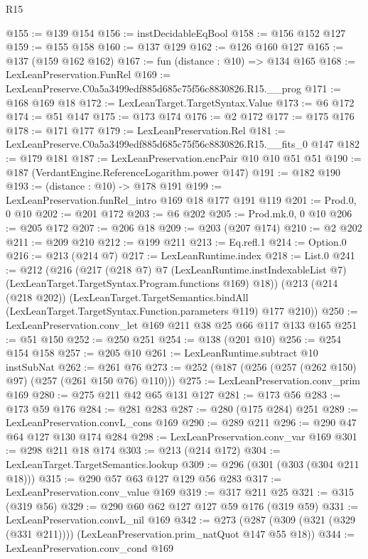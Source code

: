 \begin{lexlean}{R15}
\begin{coremodule}
@155 := @139 @154
@156 := instDecidableEqBool
@158 := @156 @152 @127
@159 := @155 @158
@160 := @137 @129
@162 := @126 @160 @127
@165 := @137 (@159 @162 @162)
@167 := fun (distance : @10) => @134 @165
@168 := LexLeanPreservation.FunRel
@169 := LexLeanPreserve.C0a5a3499edf885d685c75f56c8830826.R15.__prog
@171 := @168 @169 @18
@172 := LexLeanTarget.TargetSyntax.Value
@173 := @6 @172
@174 := @51 @147
@175 := @173 @174
@176 := @2 @172
@177 := @175 @176
@178 := @171 @177
@179 := LexLeanPreservation.Rel
@181 := LexLeanPreserve.C0a5a3499edf885d685c75f56c8830826.R15.__fits_0 @147
@182 := @179 @181
@187 := LexLeanPreservation.encPair @10 @10 @51 @51
@190 := @187 (VerdantEngine.ReferenceLogarithm.power @147)
@191 := @182 @190
@193 := (distance : @10) -> @178 @191
@199 := LexLeanPreservation.funRel_intro @169 @18 @177 @191 @119
@201 := Prod.{0, 0} @10
@202 := @201 @172
@203 := @6 @202
@205 := Prod.mk.{0, 0} @10
@206 := @205 @172
@207 := @206 @18
@209 := @203 (@207 @174)
@210 := @2 @202
@211 := @209 @210
@212 := @199 @211
@213 := Eq.refl.{1}
@214 := Option.{0}
@216 := @213 (@214 @7)
@217 := LexLeanRuntime.index
@218 := List.{0}
@241 := @212
    (@216
      (@217
        (@218 @7)
        @7
        (LexLeanRuntime.instIndexableList @7)
        (LexLeanTarget.TargetSyntax.Program.functions @169)
        @18))
    (@213
      (@214 (@218 @202))
      (LexLeanTarget.TargetSemantics.bindAll
        (LexLeanTarget.TargetSyntax.Function.parameters @119)
        @177
        @210))
@250 := LexLeanPreservation.conv_let @169 @211 @38 @25 @66 @117 @133 @165
@251 := @51 @150
@252 := @250 @251
@254 := @138 (@201 @10)
@256 := @254 @154 @158
@257 := @205 @10
@261 := LexLeanRuntime.subtract @10 instSubNat
@262 := @261 @76
@273 := @252 (@187 (@256 (@257 (@262 @150) @97) (@257 (@261 @150 @76) @110)))
@275 := LexLeanPreservation.conv_prim @169
@280 := @275 @211 @42 @65 @131 @127
@281 := @173 @56
@283 := @173 @59 @176
@284 := @281 @283
@287 := @280 (@175 @284) @251
@289 := LexLeanPreservation.convL_cons @169
@290 := @289 @211
@296 := @290 @47 @64 @127 @130 @174 @284
@298 := LexLeanPreservation.conv_var @169
@301 := @298 @211 @18 @174
@303 := @213 (@214 @172)
@304 := LexLeanTarget.TargetSemantics.lookup
@309 := @296 (@301 (@303 (@304 @211 @18)))
@315 := @290 @57 @63 @127 @129 @56 @283
@317 := LexLeanPreservation.conv_value @169
@319 := @317 @211 @25
@321 := @315 (@319 @56)
@329 := @290 @60 @62 @127 @127 @59 @176 (@319 @59)
@331 := LexLeanPreservation.convL_nil @169
@342 := @273 (@287 (@309 (@321 (@329 (@331 @211)))) (LexLeanPreservation.prim_natQuot @147 @55 @18))
@344 := LexLeanPreservation.conv_cond @169

\end{coremodule}
\end{lexlean}
